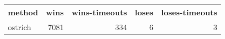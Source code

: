\begin{tabular}{lrrrr}
\hline
 method   &   wins &   wins-timeouts &   loses &   loses-timeouts \\
\hline
 ostrich  &   7081 &             334 &       6 &                3 \\
\hline
\end{tabular}
